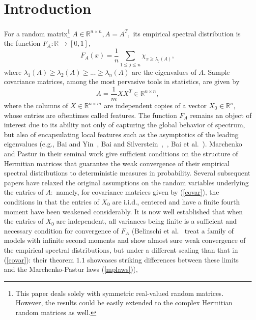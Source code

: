 \documentclass{article}
\numberwithin{equation}{section}
\begin{document}
    

\section{Introduction}

For a random matrix\footnote{This paper deals solely with symmetric real-valued random matrices. However, the results could be easily extended to the complex Hermitian random matrices as well.} \(A \in \mathbb{R}^{n \times n},A=A^T,\) its empirical spectral distribution is the function \(F_{A}:\mathbb{R} \to [0,1],\) %
\[F_A(x)=\frac{1}{n}\sum_{1 \leq j \leq n}{\chi_{x \geq \lambda_j(A)}},\]
where \(\lambda_1(A) \geq \lambda_2(A) \geq ... \geq \lambda_n(A)\) are the eigenvalues of \(A.\) Sample covariance matrices, among the most pervasive tools in statistics, are given by %
\begin{equation}\tag{\(M\)}\label{covar}
    A=\frac{1}{m}XX^T \in \mathbb{R}^{n \times n},
\end{equation}
where the columns of \(X \in \mathbb{R}^{n \times m}\) are independent copies of a vector \(X_0 \in \mathbb{R}^n,\) whose entries are oftentimes called features. The function \(F_A\) remains an object of interest due to its ability not only of capturing the global behavior of spectrum, but also of encapsulating local features such as the asymptotics of the leading eigenvalues (e.g., Bai and Yin~\cite{baiyin}, Bai and Silverstein~\cite{baisilv1s},~\cite{baisilv2s}, Bai et al.~\cite{baietal}). Marchenko and Pastur in their seminal work \cite{marchenkopastur} give sufficient conditions on the structure of Hermitian matrices that guarantee the weak convergence of their empirical spectral distributions to deterministic measures in probability. Several subsequent papers have relaxed the original assumptions on the random variables underlying the entries of \(A:\) namely, for covariance matrices given by (\ref{covar}), the conditions in \cite{marchenkopastur} that the entries of \(X_0\) are i.i.d., centered and have a finite fourth moment have been weakened considerably. It is now well established that when the entries of \(X_0\) are independent, all variances being finite is a sufficient and necessary condition for convergence of \(F_A\) (Belinschi et al.~\cite{demboetal} treat a family of models with infinite second moments and show almost sure weak convergence of the empirical spectral distributions, but under a different scaling than that in (\ref{covar}): their theorem \(1.1\) showcases striking differences between these limits and the Marchenko-Pastur laws (\ref{mplaws})), %
\end{document}
